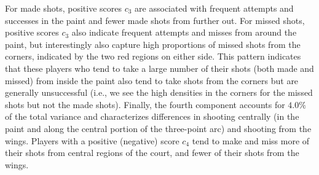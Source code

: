 \documentclass[USenglish]{article}
\theoremstyle{dgthm}
\theoremstyle{dgdef}
\begin{document}
		For made shots, positive scores $c_3$ are associated with frequent attempts and successes in the paint and fewer made shots from further out.
		For missed shots, positive scores $c_3$ also indicate frequent attempts and misses from around the paint, but interestingly also capture high proportions of missed shots from the corners, indicated by the two red regions on either side.
		This pattern indicates that these players who tend to take a large number of their shots (both made and missed) from inside the paint also tend to take shots from the corners but are generally unsuccessful (i.e., we see the high densities in the corners for the missed shots but not the made shots).
	Finally, the fourth component accounts for $4.0\%$ of the total variance and characterizes differences in shooting centrally (in the paint and along the central portion of the three-point arc) and shooting from the wings.
		Players with a positive (negative) score $c_4$ tend to make and miss more of their shots from central regions of the court, and fewer of their shots from the wings.
\end{document}
